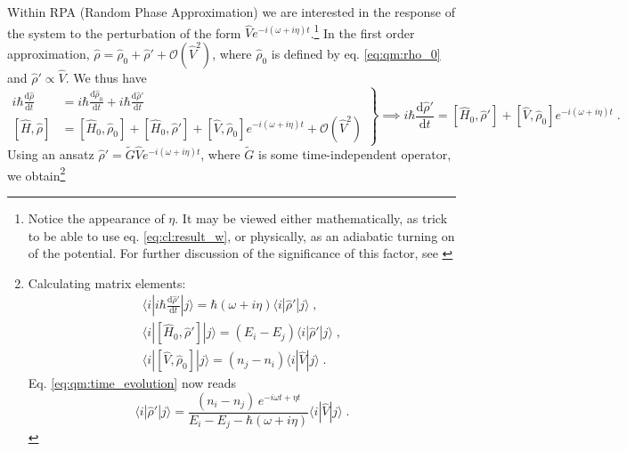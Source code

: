 \documentclass[a4paper,12pt]{article}
\begin{document}
    Within RPA (Random Phase Approximation) we are interested in the response of the system to the perturbation of the form $\hat V e^{-i(\omega + i\eta) t}$.\footnote{Notice the appearance of $\eta$. It may be viewed either mathematically, as trick to be able to use eq. \ref{eq:cl:result_w}, or physically, as an adiabatic turning on of the potential. For further discussion of the significance of this factor, see \cite{1972causality}} In the first order approximation, $\hat\rho = \hat\rho_0 + \hat\rho' + \mathcal{O}(\hat V^2)$, where $\hat\rho_0$ is defined by eq. \eqref{eq:qm:rho_0} and $\hat\rho' \propto \hat V$. We thus have
    \begin{equation} \label{eq:qm:time_evolution}
        \left.
        \begin{aligned}
            i\hbar \frac{\text{d}\hat\rho}{\text{d}t} &= i\hbar \frac{\text{d}\hat\rho_0}{\text{d}t} + i\hbar\frac{\text{d}\hat\rho'}{\text{d}t} \\
            [\hat H, \hat\rho] &= [\hat H_0, \hat \rho_0] + [\hat H_0, \hat \rho'] + [\hat V, \hat \rho_0] e^{-i (\omega + i\eta) t} + \mathcal{O}(\hat V^2)
        \end{aligned} \right\} \implies
        i\hbar \frac{\text{d}\hat\rho'}{\text{d}t} = [\hat H_0, \hat \rho'] + [\hat V, \hat \rho_0] e^{-i (\omega + i\eta) t}\; .
    \end{equation}
    Using an ansatz $\hat\rho' = \widetilde G \hat V e^{-i (\omega + i\eta) t}$, where $\widetilde G$ is some time-independent operator, we obtain\footnote{ %
    Calculating matrix elements:
    \begin{equation*}
    \begin{gathered}
        \langle i | i\hbar \frac{\text{d}\hat\rho'}{\text{d}t} | j \rangle = 
            \hbar(\omega + i\eta)\langle i| \hat\rho' | j \rangle\; , \\
        \langle i | [\hat H_0, \hat\rho'] | j \rangle = (E_i - E_j) \langle i| \hat\rho' | j \rangle\; , \\
        \langle i | [\hat V, \hat\rho_0] | j \rangle = (n_j - n_i) \langle i| \hat V | j \rangle\; .
    \end{gathered}
    \end{equation*}
    Eq. \eqref{eq:qm:time_evolution} now reads
    \begin{equation*}
         \langle i| \hat\rho' |j\rangle =
            \frac{(n_i - n_j)\, e^{-i\omega t + \eta t}}{E_i - E_j - \hbar(\omega + i\eta)} \langle i| \hat V |j \rangle \; .
    \end{equation*}
} %
\end{document}
